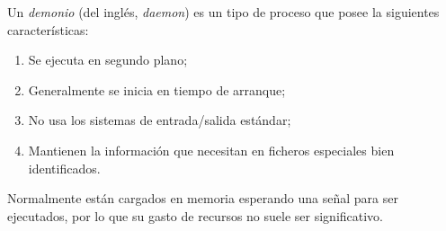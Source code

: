 Un \emph{demonio} (del inglés, \emph{daemon}) es un tipo de proceso que posee la siguientes características:

\begin{enumerate}
	\item Se ejecuta en segundo plano;
	\item Generalmente se inicia en tiempo de arranque;
	\item No usa los sistemas de entrada/salida est\'andar;
	\item Mantienen la información que necesitan en ficheros especiales bien identificados.
\end{enumerate}

%
%

Normalmente est\'an cargados en memoria esperando una señal para ser ejecutados, por lo que su gasto de recursos no suele ser significativo.


%
%


